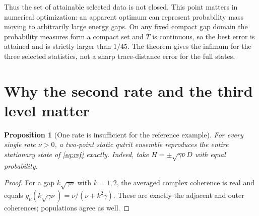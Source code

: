 \documentclass[11pt,a4paper]{article}
\newtheorem{proposition}[theorem]{Proposition}
\begin{document}
Thus the set of attainable selected data is not closed. This point
matters in numerical optimization: an apparent optimum can represent
probability mass moving to arbitrarily large energy gaps. On any fixed
compact gap domain the probability measures form a compact set and
$T$ is continuous, so the best error is attained and is strictly larger
than $1/45$. The theorem gives the infimum for the three selected
statistics, not a sharp trace-distance error for the full states.

\section{Why the second rate and the third level matter}
\begin{proposition}[One rate is insufficient for the reference example]
For every single rate $\nu>0$, a two-point static qutrit ensemble
reproduces the entire stationary state of \eqref{eq:ref} exactly.
Indeed, take $H=\pm\sqrt{\gamma\nu}D$ with equal probability.
\end{proposition}
\begin{proof}
For a gap $k\sqrt{\gamma\nu}$ with $k=1,2$, the averaged complex
coherence is real and equals
$g_\nu(k\sqrt{\gamma\nu})=\nu/(\nu+k^2\gamma)$.
These are exactly the adjacent and outer coherences; populations
agree as well.
\end{proof}
\end{document}
